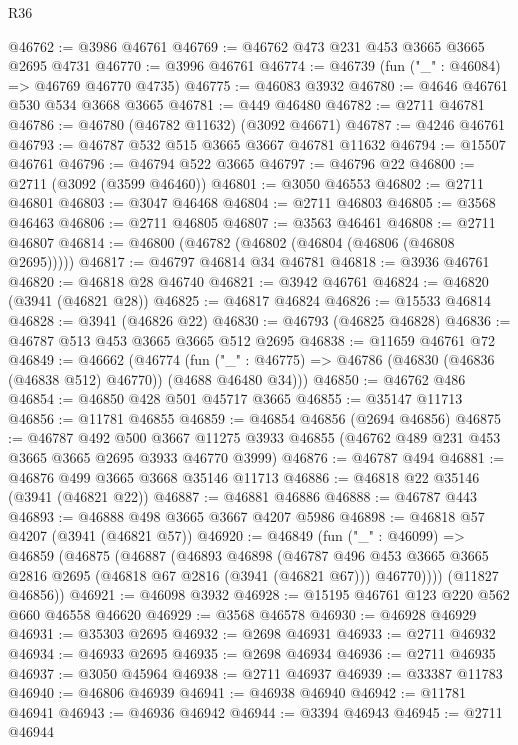 \begin{lexlean}{R36}
\begin{coremodule}
@46762 := @3986 @46761
@46769 := @46762 @473 @231 @453 @3665 @3665 @2695 @4731
@46770 := @3996 @46761
@46774 := @46739 (fun ("_" : @46084) => @46769 @46770 @4735)
@46775 := @46083 @3932
@46780 := @4646 @46761 @530 @534 @3668 @3665
@46781 := @449 @46480
@46782 := @2711 @46781
@46786 := @46780 (@46782 @11632) (@3092 @46671)
@46787 := @4246 @46761
@46793 := @46787 @532 @515 @3665 @3667 @46781 @11632
@46794 := @15507 @46761
@46796 := @46794 @522 @3665
@46797 := @46796 @22
@46800 := @2711 (@3092 (@3599 @46460))
@46801 := @3050 @46553
@46802 := @2711 @46801
@46803 := @3047 @46468
@46804 := @2711 @46803
@46805 := @3568 @46463
@46806 := @2711 @46805
@46807 := @3563 @46461
@46808 := @2711 @46807
@46814 := @46800 (@46782 (@46802 (@46804 (@46806 (@46808 @2695)))))
@46817 := @46797 @46814 @34 @46781
@46818 := @3936 @46761
@46820 := @46818 @28 @46740
@46821 := @3942 @46761
@46824 := @46820 (@3941 (@46821 @28))
@46825 := @46817 @46824
@46826 := @15533 @46814
@46828 := @3941 (@46826 @22)
@46830 := @46793 (@46825 @46828)
@46836 := @46787 @513 @453 @3665 @3665 @512 @2695
@46838 := @11659 @46761 @72
@46849 := @46662
    (@46774
      (fun ("_" : @46775) => @46786 (@46830 (@46836 (@46838 @512) @46770)) (@4688 @46480 @34)))
@46850 := @46762 @486
@46854 := @46850 @428 @501 @45717 @3665
@46855 := @35147 @11713
@46856 := @11781 @46855
@46859 := @46854 @46856 (@2694 @46856)
@46875 := @46787
    @492
    @500
    @3667
    @11275
    @3933
    @46855
    (@46762 @489 @231 @453 @3665 @3665 @2695 @3933 @46770 @3999)
@46876 := @46787 @494
@46881 := @46876 @499 @3665 @3668 @35146 @11713
@46886 := @46818 @22 @35146 (@3941 (@46821 @22))
@46887 := @46881 @46886
@46888 := @46787 @443
@46893 := @46888 @498 @3665 @3667 @4207 @5986
@46898 := @46818 @57 @4207 (@3941 (@46821 @57))
@46920 := @46849
    (fun ("_" : @46099) =>
    @46859
      (@46875
        (@46887
          (@46893
            @46898
            (@46787
              @496
              @453
              @3665
              @3665
              @2816
              @2695
              (@46818 @67 @2816 (@3941 (@46821 @67)))
              @46770))))
      (@11827 @46856))
@46921 := @46098 @3932
@46928 := @15195 @46761 @123 @220 @562 @660 @46558 @46620
@46929 := @3568 @46578
@46930 := @46928 @46929
@46931 := @35303 @2695
@46932 := @2698 @46931
@46933 := @2711 @46932
@46934 := @46933 @2695
@46935 := @2698 @46934
@46936 := @2711 @46935
@46937 := @3050 @45964
@46938 := @2711 @46937
@46939 := @33387 @11783
@46940 := @46806 @46939
@46941 := @46938 @46940
@46942 := @11781 @46941
@46943 := @46936 @46942
@46944 := @3394 @46943
@46945 := @2711 @46944

\end{coremodule}
\end{lexlean}
